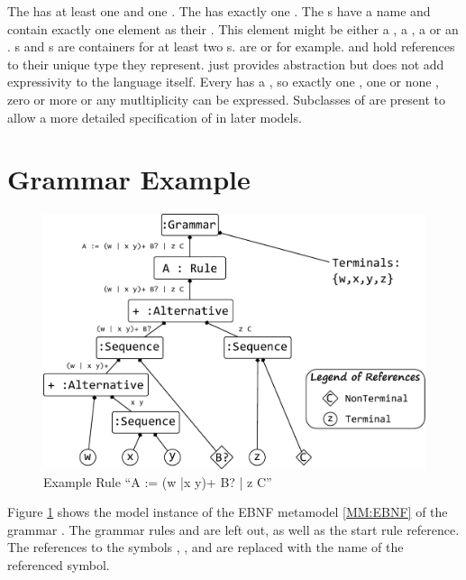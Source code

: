 The  has at least one  and one . The  has exactly one . The s have a name and contain exactly one element as their . This element might be either a , a , a  or an . s and s are containers for at least two s.  are  or  for example.  and  hold references to their unique type they represent.  just provides abstraction but does not add expressivity to the language itself. Every  has a , so exactly one , one or none , zero or more \code{+} or any mutltiplicity \code{*} can be expressed. Subclasses of  are present to allow a more detailed specification of  in later models.



\section{Grammar Example}
\begin{figure}
\centering
\includegraphics[scale=0.7]{gfx/ex/grammarExample} 
\caption{Example Rule ``A := (w |x y)+ B? | z C''}
\label{MM:GrammarExample}
\end{figure}
Figure \ref{MM:GrammarExample} shows the model instance of the EBNF metamodel \ref{MM:EBNF} of the grammar  . The grammar rules  and  are left out, as well as the start rule reference. The references to the symbols , ,  and  are replaced with the name of the referenced symbol.

